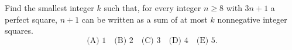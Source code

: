 Find the smallest integer $k$ such that, for every integer $n\ge8$ with $3n+1$ a perfect square, $n+1$ can be written as a sum of at most $k$ nonnegative integer squares.\[\text{(A) }1\quad\text{(B) }2\quad\text{(C) }3\quad\text{(D) }4\quad\text{(E) }5.\]
